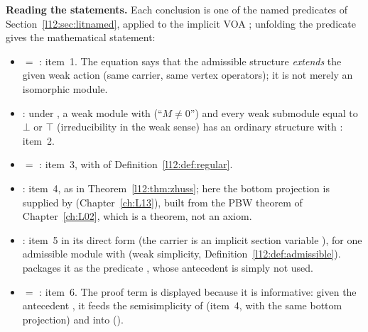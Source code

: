 \begin{dictionary}
\textbf{Reading the statements.} Each conclusion is one of the named predicates of Section~\ref{l12:sec:litnamed},
applied to the implicit VOA ; unfolding the predicate gives the mathematical statement:
\begin{itemize}
\item {} $=$ : item~1. The equation  says that the admissible structure \emph{extends} the
  given weak action (same carrier, same vertex operators); it is not merely an isomorphic module.
\item {}: under , a weak module  with 
  (``$M\neq0$'') and every weak submodule  equal to $\bot$ or $\top$ (irreducibility in the weak sense) has an
  ordinary structure  with : item~2.
\item {} $=$ : item~3, with
   of Definition~\ref{l12:def:regular}.
\item {}: item~4, as in Theorem~\ref{l12:thm:zhuss}; here the bottom projection  is
  supplied by  (Chapter~\ref{ch:L13}), built from the PBW theorem  of
  Chapter~\ref{ch:L02}, which is a theorem, not an axiom.
\item {}: item~5 in its direct form (the carrier  is an implicit section
  variable ), for one admissible module  with
   (weak simplicity, Definition~\ref{l12:def:admissible}). 
  packages it as the predicate , whose  antecedent is simply
  not used.
\item {} $=$ : item~6. The proof term is
  displayed because it is informative: given the antecedent , it feeds the semisimplicity of 
  (item~4, with the same bottom projection) and  into 
  ().
\end{itemize}


\end{dictionary}
